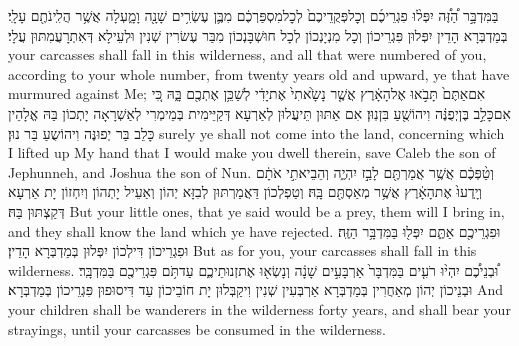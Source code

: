 {בַּמִּדְבָּ֣ר הַ֠זֶּ֠ה יִפְּל֨וּ פִגְרֵיכֶ֜ם וְכׇל\maqqaf פְּקֻדֵיכֶם֙ לְכׇל\maqqaf מִסְפַּרְכֶ֔ם מִבֶּ֛ן עֶשְׂרִ֥ים שָׁנָ֖ה וָמָ֑עְלָה אֲשֶׁ֥ר הֲלִֽינֹתֶ֖ם עָלָֽי׃}
{בְּמַדְבְּרָא הָדֵין יִפְּלוּן פִּגְרֵיכוֹן וְכָל מִנְיָנְכוֹן לְכָל חוּשְׁבָּנְכוֹן מִבַּר עֶשׂרִין שְׁנִין וּלְעֵילָא דְּאִתְרָעֲמִתּוּן עֲלָי׃}
{your carcasses shall fall in this wilderness, and all that were numbered of you, according to your whole number, from twenty years old and upward, ye that have murmured against Me;}{}
{אִם\maqqaf אַתֶּם֙ תָּבֹ֣אוּ אֶל\maqqaf הָאָ֔רֶץ אֲשֶׁ֤ר נָשָׂ֙אתִי֙ אֶת\maqqaf יָדִ֔י לְשַׁכֵּ֥ן אֶתְכֶ֖ם בָּ֑הּ כִּ֚י אִם\maqqaf כָּלֵ֣ב בֶּן\maqqaf יְפֻנֶּ֔ה וִיהוֹשֻׁ֖עַ בִּן\maqqaf נֽוּן׃}
{אִם אַתּוּן תֵּיעֲלוּן לְאַרְעָא דְּקַיֵּימִית בְּמֵימְרִי לְאַשְׁרָאָה יָתְכוֹן בַּהּ אֱלָהֵין כָּלֵב בַּר יְפוּנֶּה וִיהוֹשֻעַ בַּר נוּן׃}
{surely ye shall not come into the land, concerning which I lifted up My hand that I would make you dwell therein, save Caleb the son of Jephunneh, and Joshua the son of Nun.}{}
{וְטַ֨פְּכֶ֔ם אֲשֶׁ֥ר אֲמַרְתֶּ֖ם לָבַ֣ז יִהְיֶ֑ה וְהֵבֵיאתִ֣י אֹתָ֔ם וְיָֽדְעוּ֙ אֶת\maqqaf הָאָ֔רֶץ אֲשֶׁ֥ר מְאַסְתֶּ֖ם בָּֽהּ׃}
{וְטַפְלְכוֹן דַּאֲמַרְתּוּן לְבִזָּא יְהוֹן וְאַעֵיל יָתְהוֹן וְיִחְזוֹן יָת אַרְעָא דְּקַצְתּוּן בַּהּ׃}
{But your little ones, that ye said would be a prey, them will I bring in, and they shall know the land which ye have rejected.}{}
{וּפִגְרֵיכֶ֖ם אַתֶּ֑ם יִפְּל֖וּ בַּמִּדְבָּ֥ר הַזֶּֽה׃}
{וּפִגְרֵיכוֹן דִּילְכוֹן יִפְּלוּן בְּמַדְבְּרָא הָדֵין׃}
{But as for you, your carcasses shall fall in this wilderness.}{}
{וּ֠בְנֵיכֶ֠ם יִהְי֨וּ רֹעִ֤ים בַּמִּדְבָּר֙ אַרְבָּעִ֣ים שָׁנָ֔ה וְנָשְׂא֖וּ אֶת\maqqaf זְנוּתֵיכֶ֑ם עַד\maqqaf תֹּ֥ם פִּגְרֵיכֶ֖ם בַּמִּדְבָּֽר׃}
{וּבְנֵיכוֹן יְהוֹן מְאַחֲרִין בְּמַדְבְּרָא אַרְבְּעִין שְׁנִין וִיקַבְּלוּן יָת חוֹבֵיכוֹן עַד דִּיסוּפוּן פִּגְרֵיכוֹן בְּמַדְבְּרָא׃}
{And your children shall be wanderers in the wilderness forty years, and shall bear your strayings, until your carcasses be consumed in the wilderness.}{}
